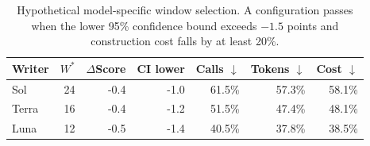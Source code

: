 \begin{table}[t]
\centering
\caption{Hypothetical model-specific window selection. A configuration passes when the lower 95\% confidence bound exceeds $-1.5$ points and construction cost falls by at least 20\%.}
\label{tab:mock_chunk_selection}
\small
\begin{tabular}{lrrrrrr}
\toprule
Writer & $W^*$ & $\Delta$Score & CI lower & Calls $\downarrow$ & Tokens $\downarrow$ & Cost $\downarrow$ \\
\midrule
Sol & 24 & -0.4 & -1.0 & 61.5\% & 57.3\% & 58.1\% \\
Terra & 16 & -0.4 & -1.2 & 51.5\% & 47.4\% & 48.1\% \\
Luna & 12 & -0.5 & -1.4 & 40.5\% & 37.8\% & 38.5\% \\
\bottomrule
\end{tabular}
\end{table}

